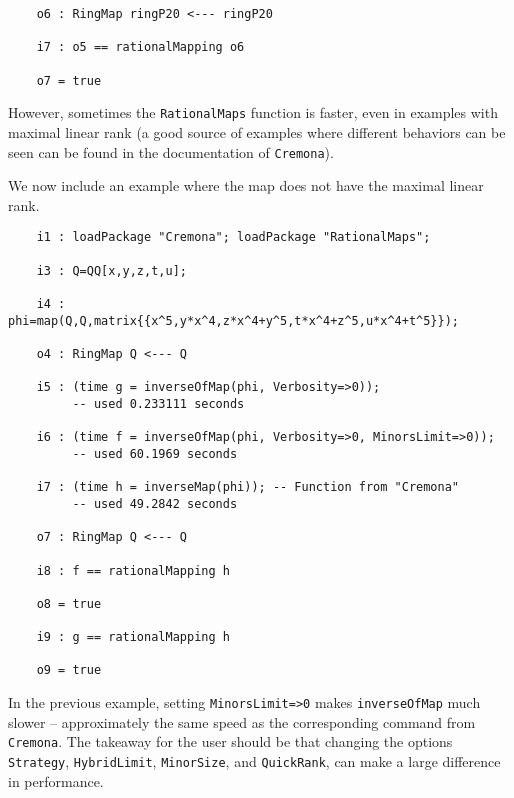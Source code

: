 \documentclass[11pt]{amsart}%
\numberwithin{equation}{theorem}
\renewcommand{\:}{\colon}
\theoremstyle{theorem}
\begin{document}
{{{\begin{verbatim}
    o6 : RingMap ringP20 <--- ringP20                                                                         
    
    i7 : o5 == rationalMapping o6    
    
    o7 = true
\end{verbatim}
}
{\color{black}\normalsize}
However, sometimes the {\tt RationalMaps} function is faster, even in examples with maximal linear rank (a good source of examples where different behaviors can be seen can be found in the documentation of {\tt Cremona}). %
}
{\color{black}\normalsize
We now include an example where the map does not have the maximal linear rank.  %
}
{\scriptsize
\color{blue}\begin{verbatim}
    i1 : loadPackage "Cremona"; loadPackage "RationalMaps";

    i3 : Q=QQ[x,y,z,t,u];    

    i4 : phi=map(Q,Q,matrix{{x^5,y*x^4,z*x^4+y^5,t*x^4+z^5,u*x^4+t^5}});    

    o4 : RingMap Q <--- Q                                                                                     

    i5 : (time g = inverseOfMap(phi, Verbosity=>0));
         -- used 0.233111 seconds                                                                             

    i6 : (time f = inverseOfMap(phi, Verbosity=>0, MinorsLimit=>0));
         -- used 60.1969 seconds                                                                          

    i7 : (time h = inverseMap(phi)); -- Function from "Cremona"                                           
         -- used 49.2842 seconds                                                                              

    o7 : RingMap Q <--- Q                                                                                     

    i8 : f == rationalMapping h

    o8 = true

    i9 : g == rationalMapping h

    o9 = true
\end{verbatim}
}
{\color{black}\normalsize
In the previous example, setting {\tt MinorsLimit=>0} makes {\tt inverseOfMap} much slower -- approximately the same speed as the  corresponding command from {\tt Cremona}.
The takeaway for the user should be that changing the options {\tt Strategy}, {\tt HybridLimit}, {\tt MinorSize}, and {\tt QuickRank}, can make a large difference in performance.

}}
\end{document}
